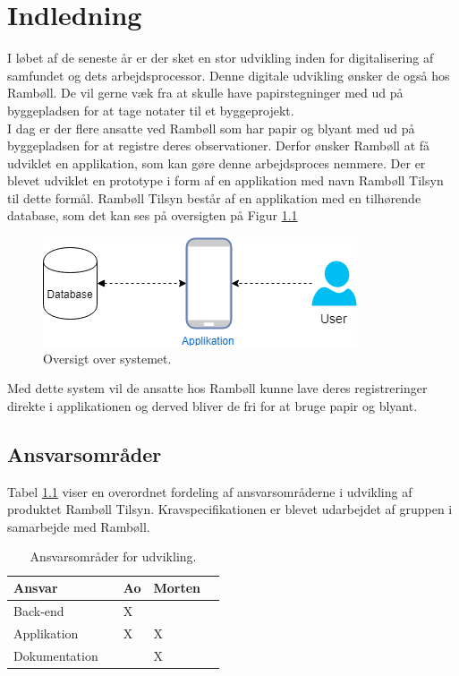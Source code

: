 \chapter{Indledning}

I løbet af de seneste år er der sket en stor udvikling inden for digitalisering af samfundet og dets arbejdsprocessor\cite{Erhverv}. Denne digitale udvikling ønsker de også hos Rambøll. De vil gerne væk fra at skulle have papirstegninger med ud på byggepladsen for at tage notater til et byggeprojekt. \\
I dag er der flere ansatte ved Rambøll som har papir og blyant med ud på byggepladsen for at registre deres observationer. Derfor ønsker Rambøll at få udviklet en applikation, som kan gøre denne arbejdsproces nemmere.
Der er blevet udviklet en prototype i form af en applikation med navn Rambøll Tilsyn til dette formål.
Rambøll Tilsyn består af en applikation med en tilhørende database, som det kan ses på oversigten på Figur \ref{fig:OversigtSystembeskrivelse}


\begin{figure}[H]
	\centering
	\includegraphics[width=0.4\linewidth]{Indledning/Oversigtoversystem}
	\caption{Oversigt over systemet.}
	\label{fig:OversigtSystembeskrivelse}
\end{figure}

Med dette system vil de ansatte hos Rambøll kunne lave deres registreringer direkte i applikationen og derved bliver de fri for at bruge papir og blyant. \\

\section*{Ansvarsområder}
Tabel \ref{Produktansvar} viser en overordnet fordeling af ansvarsområderne i udvikling af produktet Rambøll Tilsyn. Kravspecifikationen er blevet udarbejdet af gruppen i samarbejde med Rambøll. \\

\begin{table}[H]
	\centering
	\begin{tabular}{lllll} \hline
		\textbf{Ansvar} &  & \textbf{Ao}&  \textbf{Morten}&  \\ \hline
		Back-end&  &  X&  &  \\ \hline
		Applikation&  &  X&  X&  \\ \hline
		Dokumentation& & & X& \\ \hline
	\end{tabular}
	\caption{Ansvarsområder for udvikling.}
	\label{Produktansvar}
\end{table}
